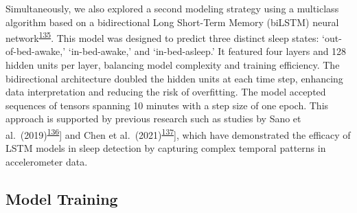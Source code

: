 \documentclass[
  9pt,
]{scrbook}
\begin{document}
Simultaneously, we also explored a second modeling strategy using a
multiclass algorithm based on a bidirectional Long Short-Term Memory
(biLSTM) neural
network\textsuperscript{\protect\hyperlink{ref-hochreiter_long_1997}{135}}.
This model was designed to predict three distinct sleep states:
`out-of-bed-awake,' `in-bed-awake,' and `in-bed-asleep.' It featured
four layers and 128 hidden units per layer, balancing model complexity
and training efficiency. The bidirectional architecture doubled the
hidden units at each time step, enhancing data interpretation and
reducing the risk of overfitting. The model accepted sequences of
tensors spanning 10 minutes with a step size of one epoch. This approach
is supported by previous research such as studies by Sano et
al.~(2019)\textsuperscript{\protect\hyperlink{ref-sano_multimodal_2019}{136}}{]}
and Chen et
al.~(2021)\textsuperscript{\protect\hyperlink{ref-chen_attention_2021}{137}}{]},
which have demonstrated the efficacy of LSTM models in sleep detection
by capturing complex temporal patterns in accelerometer data.

\hypertarget{model-training}{%
\subsection{Model Training}\label{model-training}}
\end{document}
